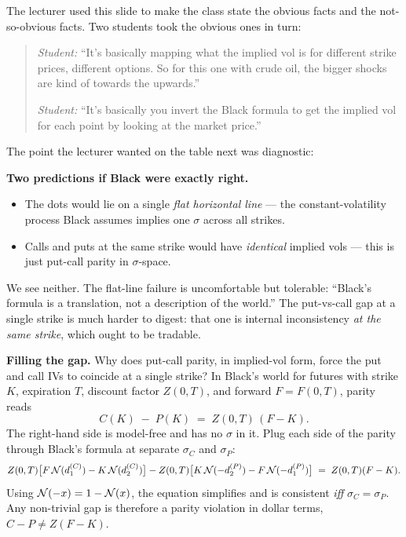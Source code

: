 The lecturer used this slide to make the class state the obvious
facts and the not-so-obvious facts. Two students took the obvious
ones in turn:

\begin{quote}
\emph{Student:} ``It's basically mapping what the implied vol is for
different strike prices, different options. So for this one with
crude oil, the bigger shocks are kind of towards the upwards.''

\emph{Student:} ``It's basically you invert the Black formula to get
the implied vol for each point by looking at the market price.''
\end{quote}

The point the lecturer wanted on the table next was diagnostic:

\begin{keyblock}
\textbf{Two predictions if Black were exactly right.}
\begin{itemize}
  \item The dots would lie on a single \emph{flat horizontal line} ---
        the constant-volatility process Black assumes implies one
        $\sigma$ across all strikes.
  \item Calls and puts at the same strike would have \emph{identical}
        implied vols --- this is just put-call parity in
        $\sigma$-space.
\end{itemize}
We see neither. The flat-line failure is uncomfortable but tolerable:
``Black's formula is a translation, not a description of the world.''
The put-vs-call gap at a single strike is much harder to digest:
that one is internal inconsistency \emph{at the same strike}, which
ought to be tradable.
\end{keyblock}

\begin{tipblock}
\textbf{Filling the gap.} Why does put-call parity, in implied-vol
form, force the put and call IVs to coincide at a single strike? In
Black's world for futures with strike $K$, expiration $T$, discount
factor $Z(0,T)$, and forward $F = F(0,T)$, parity reads
\[
  C(K) \;-\; P(K) \;=\; Z(0,T)\,(F - K).
\]
The right-hand side is model-free and has no $\sigma$ in it. Plug
each side of the parity through Black's formula at separate $\sigma_C$
and $\sigma_P$:
\[
  Z(0,T)\bigl[F\,\mathcal{N}(d_1^{(C)}) - K\,\mathcal{N}(d_2^{(C)})\bigr]
  - Z(0,T)\bigl[K\,\mathcal{N}(-d_2^{(P)}) - F\,\mathcal{N}(-d_1^{(P)})\bigr]
  \;=\; Z(0,T)(F-K).
\]
Using $\mathcal{N}(-x) = 1 - \mathcal{N}(x)$, the equation simplifies and is consistent
\emph{iff} $\sigma_C = \sigma_P$. Any non-trivial gap is therefore a
parity violation in dollar terms, $C - P \ne Z(F - K)$.
\end{tipblock}

